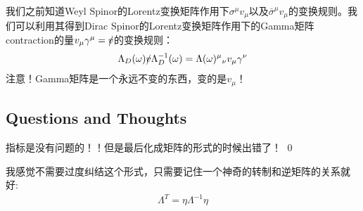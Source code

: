 \bigskip
{}

我们之前知道Weyl Spinor的Lorentz变换矩阵作用下$ \sigma^\mu v_\mu $以及$ \bar{\sigma}^\mu v_\mu $的变换规则。我们可以利用其得到Dirac Spinor的Lorentz变换矩阵作用下的Gamma矩阵contraction的量$ v_\mu \gamma^\mu = \slashed{v} $的变换规则：
\begin{align}
  \Lambda_{D}(\omega)\slashed{v}\Lambda_{D}^{-1}(\omega)=\Lambda(\omega)^\mu{}_\nu v_\mu \gamma^\nu
\end{align}
注意！Gamma矩阵是一个永远不变的东西，变的是$ v_\mu $！

\subsection{Questions and Thoughts}


指标是没有问题的！！但是最后化成矩阵的形式的时候出错了！
\qed 



我感觉不需要过度纠结这个形式，只需要记住一个神奇的转制和逆矩阵的关系就好:
\begin{align}
  \Lambda^T=\eta\Lambda^{-1}\eta
\end{align}
